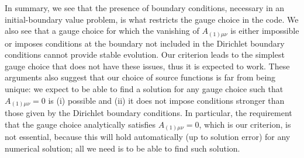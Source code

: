 \documentclass[a4paper,11pt]{article}
\numberwithin{equation}{section}
\begin{document}
In summary, we see that the presence of boundary conditions, necessary in an initial-boundary value problem, is what restricts the gauge choice in the code. We also see that a gauge choice for which the vanishing of $A_{(1)\mu\nu}$ is either impossible or imposes conditions at the boundary not included in the Dirichlet boundary conditions cannot provide stable evolution.
Our criterion leads to the simplest gauge choice that does not have these issues, thus it is expected to work. These arguments also suggest that our choice of source functions is far from being unique: we expect to be able to find a solution for any gauge choice such that $A_{(1)\mu\nu}=0$ is (i) possible and (ii) it does not impose conditions stronger than those given by the Dirichlet boundary conditions. In particular, the requirement that the gauge choice analytically satisfies $A_{(1)\mu\nu}=0$, which is our criterion, is not essential, because this will hold automatically (up to solution error) for any numerical solution; all we need is to be able to find such solution.


\end{document}
